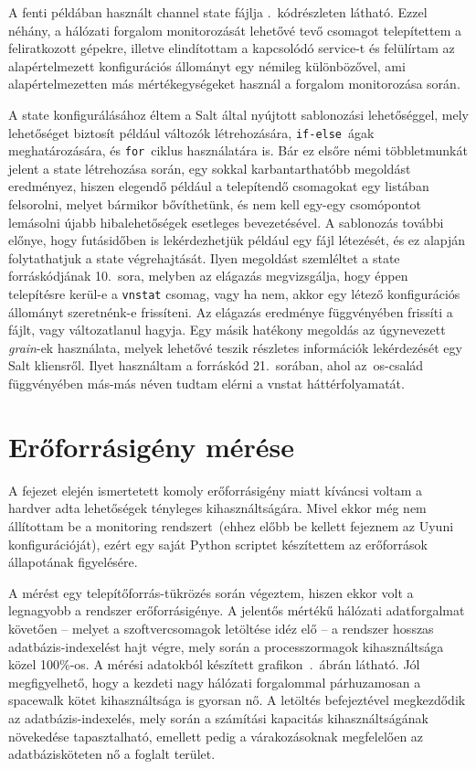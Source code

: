 A fenti példában használt channel state fájlja .~kódrészleten látható. Ezzel néhány, a hálózati forgalom monitorozását lehetővé tevő csomagot telepítettem a feliratkozott gépekre, illetve elindítottam a kapcsolódó service-t és felülírtam az alapértelmezett konfigurációs állományt egy némileg különbözővel, ami alapértelmezetten más mértékegységeket használ a forgalom monitorozása során.

A state konfigurálásához éltem a Salt által nyújtott sablonozási lehetőséggel, mely lehetőséget biztosít például változók létrehozására, \texttt{if-else}~ágak meghatározására, és \texttt{for}~ciklus használatára is. Bár ez elsőre némi többletmunkát jelent a state létrehozása során, egy sokkal karbantarthatóbb megoldást eredményez, hiszen elegendő például a telepítendő csomagokat egy listában felsorolni, melyet bármikor bővíthetünk, és nem kell egy-egy csomópontot lemásolni újabb hibalehetőségek esetleges bevezetésével. A sablonozás további előnye, hogy futásidőben is lekérdezhetjük például egy fájl létezését, és ez alapján folytathatjuk a state végrehajtását. Ilyen megoldást szemléltet a state forráskódjának 10.~sora, melyben az elágazás megvizsgálja, hogy éppen telepítésre kerül-e a \texttt{vnstat} csomag, vagy ha nem, akkor egy létező konfigurációs állományt szeretnénk-e frissíteni. Az elágazás eredménye függvényében frissíti a fájlt, vagy változatlanul hagyja. Egy másik hatékony megoldás az úgynevezett \textit{grain}-ek használata, melyek lehetővé teszik részletes információk lekérdezését egy Salt kliensről. Ilyet használtam a forráskód 21.~sorában, ahol az~\acrshort{os}-család függvényében más-más néven tudtam elérni a vnstat háttérfolyamatát.



\section{Erőforrásigény mérése}
A fejezet elején ismertetett komoly erőforrásigény miatt kíváncsi voltam a hardver adta lehetőségek tényleges kihasználtságára. Mivel ekkor még nem állítottam be a monitoring rendszert~(ehhez előbb be kellett fejeznem az Uyuni konfigurációját), ezért egy saját Python scriptet készítettem az erőforrások állapotának figyelésére.

A mérést egy telepítőforrás-tükrözés során végeztem, hiszen ekkor volt a legnagyobb a rendszer erőforrásigénye. A jelentős mértékű hálózati adatforgalmat követően -- melyet a szoftvercsomagok letöltése idéz elő -- a rendszer hosszas adatbázis-indexelést hajt végre, mely során a processzormagok kihasználtsága közel 100\%-os. A mérési adatokból készített grafikon~.~ábrán látható. Jól megfigyelhető, hogy a kezdeti nagy hálózati forgalommal párhuzamosan a spacewalk kötet kihasználtsága is gyorsan nő. A letöltés befejeztével megkezdődik az adatbázis-indexelés, mely során a számítási kapacitás kihasználtságának növekedése tapasztalható, emellett pedig a várakozásoknak megfelelően az adatbázisköteten nő a foglalt terület.


